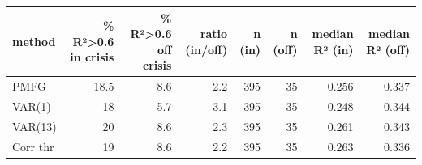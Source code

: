 \begin{tabular}{lrrrrrrr}
\toprule
method & \% R²>0.6 in crisis & \% R²>0.6 off crisis & ratio (in/off) & n (in) & n (off) & median R² (in) & median R² (off) \\
\midrule
PMFG & 18.5 & 8.6 & 2.2 & 395 & 35 & 0.256 & 0.337 \\
VAR(1) & 18 & 5.7 & 3.1 & 395 & 35 & 0.248 & 0.344 \\
VAR(13) & 20 & 8.6 & 2.3 & 395 & 35 & 0.261 & 0.343 \\
Corr thr & 19 & 8.6 & 2.2 & 395 & 35 & 0.263 & 0.336 \\
\bottomrule
\end{tabular}
